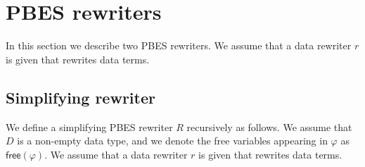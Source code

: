 

\section{PBES rewriters}

In this section we describe two PBES rewriters. We assume that a data
rewriter $r$ is given that rewrites data terms.

\subsection{Simplifying rewriter}

We define a simplifying PBES rewriter $R$ recursively as follows. We assume
that $D$ is a non-empty data type, and we denote the free variables
appearing in $\varphi $ as $\mathsf{free}(\varphi )$. We assume that a data
rewriter $r$ is given that rewrites data terms.%
